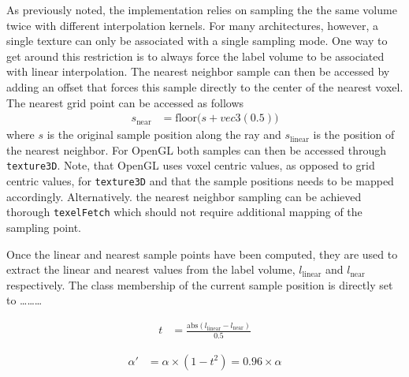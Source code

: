 \documentclass{egpubl}
\begin{document}
As previously noted, the implementation relies on sampling the the same volume twice with different interpolation kernels. For many architectures, however, a single texture can only be associated with a single sampling mode. One way to get around this restriction is to always force the label volume to be associated with linear interpolation. The nearest neighbor sample can then be accessed by adding an offset that forces this sample directly to the center of the nearest voxel. The nearest grid point can be accessed as follows
\begin{align}
s_\mathrm{near} &= \mathrm{floor}\big(s + vec3(0.5)\big) \label{eq:near}  
\end{align}
where $s$ is the original sample position along the ray and $s_\mathrm{linear}$ is the position of the nearest neighbor. For OpenGL both samples can then be accessed through \texttt{texture3D}. Note, that OpenGL uses voxel centric values, as opposed to grid centric values, for \texttt{texture3D} and that the sample positions needs to be mapped accordingly. Alternatively. the nearest neighbor sampling can be achieved thorough \texttt{texelFetch} which should not require additional mapping of the sampling point.

Once the linear and nearest sample points have been computed, they are used to extract the linear and nearest values from the label volume, $l_\mathrm{linear}$ and $l_\mathrm{near}$ respectively. The class membership of the current sample position is directly set to \dots\dots\dots

\begin{align}
t &= \frac{\mathrm{abs}(l_\mathrm{linear} - l_\mathrm{near})}{0.5} \label{eq:gamma}
\end{align}

\begin{align}
\alpha' &= \alpha \times (1-t^2) = 0.96 \times \alpha \label{eq:alpha}
\end{align}
\end{document}

